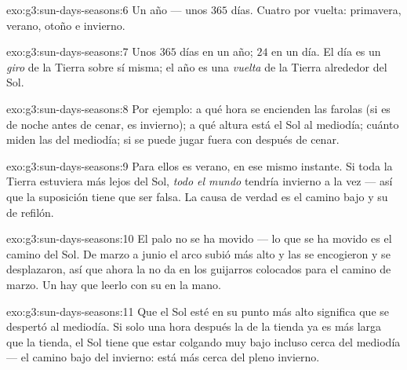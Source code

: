 \begin{solution}{exo:g3:sun-days-seasons:6}
Un año --- unos $365$ días. Cuatro  por vuelta: primavera,
verano, otoño e invierno.
\end{solution}

\begin{solution}{exo:g3:sun-days-seasons:7}
Unos $365$ días en un año; $24$  en un día. El día es un
\emph{giro} de la Tierra sobre sí misma; el año es una \emph{vuelta}
de la Tierra alrededor del Sol.
\end{solution}

\begin{solution}{exo:g3:sun-days-seasons:8}
Por ejemplo: a qué hora se encienden las farolas (si es de noche antes
de cenar, es invierno); a qué altura está el Sol al mediodía; cuánto
miden las  del mediodía; si se puede jugar fuera con 
después de cenar.
\end{solution}

\begin{solution}{exo:g3:sun-days-seasons:9}
Para ellos es verano, en ese mismo instante. Si toda la Tierra
estuviera más lejos del Sol, \emph{todo el mundo} tendría invierno a
la vez --- así que la suposición tiene que ser falsa. La causa de
verdad es el camino bajo y su  de refilón.
\end{solution}

\begin{solution}{exo:g3:sun-days-seasons:10}
El palo no se ha movido --- lo que se ha movido es el camino del Sol.
De marzo a junio el arco subió más alto y las  se encogieron y
se desplazaron, así que ahora la  no da en los guijarros
colocados para el camino de marzo. Un  hay que leerlo con
su  en la mano.
\end{solution}

\begin{solution}{exo:g3:sun-days-seasons:11}
Que el Sol esté en su punto más alto significa que se despertó al
mediodía. Si solo una hora después la  de la tienda ya es más
larga que la tienda, el Sol tiene que estar colgando muy bajo incluso
cerca del mediodía --- el camino bajo del invierno: está más cerca del
pleno invierno.
\end{solution}
